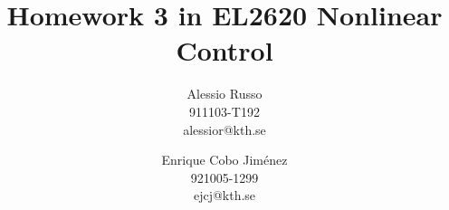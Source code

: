 \documentclass[a4paper,twocolumn]{article} %
\begin{document}

\title{Homework 3 in EL2620 Nonlinear Control}
\author{Alessio Russo \\ 911103-T192 \\ alessior@kth.se \and Enrique Cobo Jim\'enez\\
  921005-1299 \\ ejcj@kth.se}


\maketitle                     %
















\end{document}
